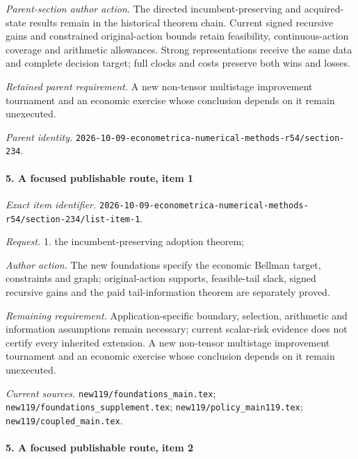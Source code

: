 \emph{Parent-section author action.} The directed incumbent-preserving and acquired-state results remain in the historical theorem chain. Current signed recursive gains and constrained original-action bounds retain feasibility, continuous-action coverage and arithmetic allowances. Strong representations receive the same data and complete decision target; full clocks and costs preserve both wins and losses.

\par\emph{Retained parent requirement.} A new non-tensor multistage improvement tournament and an economic exercise whose conclusion depends on it remain unexecuted.

\par\emph{Parent identity.} \nolinkurl{2026-10-09-econometrica-numerical-methods-r54/section-234}.

\paragraph{5. A focused publishable route, item 1}

\emph{Exact item identifier.} \nolinkurl{2026-10-09-econometrica-numerical-methods-r54/section-234/list-item-1}.

\par\emph{Request.} 1. the incumbent-preserving adoption theorem;

\par\emph{Author action.} The new foundations specify the economic Bellman target, constraints and graph; original-action supports, feasible-tail slack, signed recursive gains and the paid tail-information theorem are separately proved.

\par\emph{Remaining requirement.} Application-specific boundary, selection, arithmetic and information assumptions remain necessary; current scalar-risk evidence does not certify every inherited extension. A new non-tensor multistage improvement tournament and an economic exercise whose conclusion depends on it remain unexecuted.

\par\emph{Current sources.} \nolinkurl{new119/foundations_main.tex}; \nolinkurl{new119/foundations_supplement.tex}; \nolinkurl{new119/policy_main119.tex}; \nolinkurl{new119/coupled_main.tex}.

\paragraph{5. A focused publishable route, item 2}

